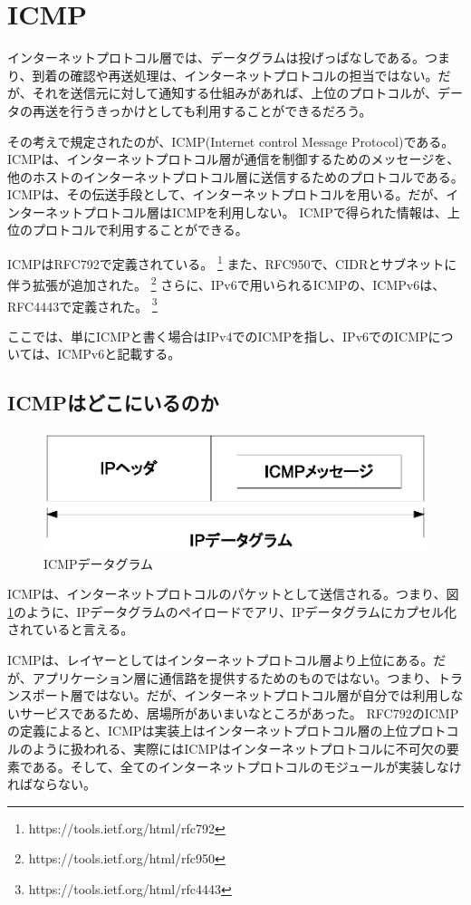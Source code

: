 \section{ICMP}
インターネットプロトコル層では、データグラムは投げっぱなしである。つまり、到着の確認や再送処理は、インターネットプロトコルの担当ではない。だが、それを送信元に対して通知する仕組みがあれば、上位のプロトコルが、データの再送を行うきっかけとしても利用することができるだろう。

その考えで規定されたのが、ICMP(Internet control Message Protocol)である。
ICMPは、インターネットプロトコル層が通信を制御するためのメッセージを、他のホストのインターネットプロトコル層に送信するためのプロトコルである。ICMPは、その伝送手段として、インターネットプロトコルを用いる。だが、インターネットプロトコル層はICMPを利用しない。
ICMPで得られた情報は、上位のプロトコルで利用することができる。

ICMPはRFC792で定義されている。
\footnote{https://tools.ietf.org/html/rfc792}
また、RFC950で、CIDRとサブネットに伴う拡張が追加された。
\footnote{https://tools.ietf.org/html/rfc950}
さらに、IPv6で用いられるICMPの、ICMPv6は、RFC4443で定義された。
\footnote{https://tools.ietf.org/html/rfc4443}

ここでは、単にICMPと書く場合はIPv4でのICMPを指し、IPv6でのICMPについては、ICMPv6と記載する。

\subsection{ICMPはどこにいるのか}

\begin{figure}[htbp]
	\includegraphics[width=12cm,clip]{draw/icmpencup.eps}
	\caption{ICMPデータグラム}
	\label{fig:icmpencup}
\end{figure}

ICMPは、インターネットプロトコルのパケットとして送信される。つまり、図\ref{fig:icmpencup}のように、IPデータグラムのペイロードでアリ、IPデータグラムにカプセル化されていると言える。

ICMPは、レイヤーとしてはインターネットプロトコル層より上位にある。だが、アプリケーション層に通信路を提供するためのものではない。つまり、トランスポート層ではない。だが、インターネットプロトコル層が自分では利用しないサービスであるため、居場所があいまいなところがあった。
RFC792のICMPの定義によると、ICMPは実装上はインターネットプロトコル層の上位プロトコルのように扱われる、実際にはICMPはインターネットプロトコルに不可欠の要素である。そして、全てのインターネットプロトコルのモジュールが実装しなければならない。

